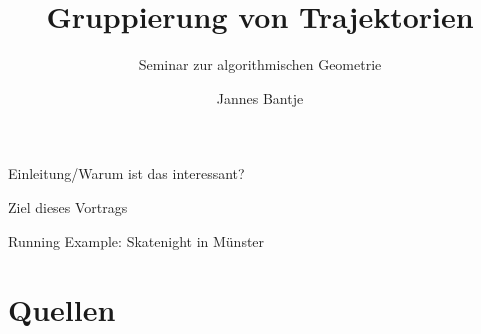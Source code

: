 \documentclass[
wide,
10pt,
xcolor={x11names,svgnames},
hyperref={pdfauthor={Jannes Bantje},colorlinks,urlcolor=maincolor,hidelinks=false,linkcolor=maincolor},
pantone312, 	%
]{beamer}
\theoremstyle{definition}
\begin{document}
\makeatletter
\author{Jannes Bantje} \let\Author\@author
\title{Gruppierung von Trajektorien}
\subtitle{Seminar zur algorithmischen Geometrie}
\makeatother


\begin{frame}[plain]
  \maketitle
\end{frame}

\begin{frame}{Einleitung/Warum ist das interessant?}
    
\end{frame}

\begin{frame}{Ziel dieses Vortrags}
    
\end{frame}

\begin{frame}{Running Example: Skatenight in Münster}
    
\end{frame}


\section*{Quellen}
\begin{frame}[allowframebreaks]{\secname}
	\printbibliography
\end{frame}
\end{document}
